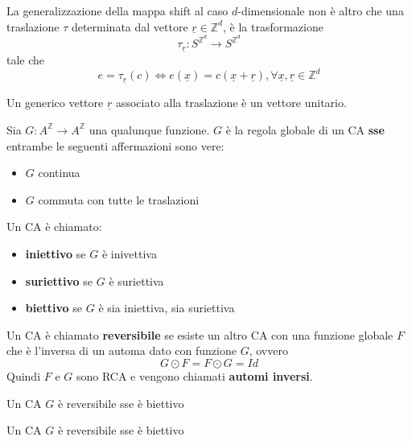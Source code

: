 La generalizzazione della mappa shift al caso $d$-dimensionale non è altro che una 
traslazione $\tau$ determinata dal vettore $\underline{r}\in  \mathbb{Z}^d$, è
la trasformazione
$$\tau_{\underline{r}} :  S^{\mathbb{Z}^d} \rightarrow  S^{\mathbb{Z}^d}$$
tale che 
$$e =\tau_{\underline{r}}(c) \iff e(\underline{x}) =  c(\underline{x}+\underline{r}), \forall \underline{x},\underline{r}\in \mathbb{Z}^d$$

Un generico vettore $\underline{r}$ associato alla traslazione è un vettore 
unitario.

\begin{teorema}  
    Sia $G:A^\mathbb{Z}\rightarrow A^\mathbb{Z}$ una qualunque funzione.
    $G$ è la regola globale di un CA \textbf{sse} entrambe le seguenti affermazioni
    sono vere:
    \begin{itemize}
        \item $G$ continua
        \item $G$ commuta con tutte le traslazioni
    \end{itemize}
\end{teorema}

\begin{definizione} 
    Un CA è chiamato:
    \begin{itemize}
        \item \textbf{iniettivo} se $G$ è inivettiva
        \item \textbf{suriettivo} se $G$ è suriettiva
        \item \textbf{biettivo} se $G$ è sia iniettiva, sia suriettiva
    \end{itemize}

\end{definizione}


\begin{definizione} 
    Un CA è chiamato \textbf{reversibile} se esiste un altro CA con una funzione 
    globale $F$ che è l'inversa di un automa dato con funzione $G$, ovvero
    $$ G\odot F= F\odot G = Id$$
    Quindi $F$ e $G$ sono RCA e vengono chiamati \textbf{automi inversi}.
\end{definizione}

\begin{teorema}
    Un CA $G$ è reversibile sse è biettivo
\end{teorema}
\begin{teorema}
    Un CA $G$ è reversibile sse è biettivo
\end{teorema}


